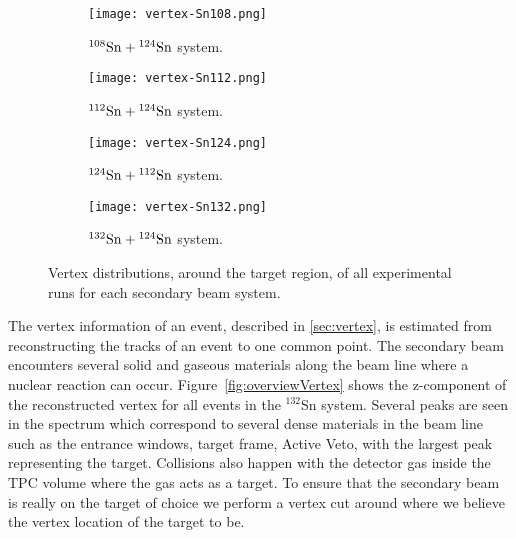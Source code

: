 \begin{figure}[!htb]
\centering
    \begin{subfigure}[t]{\textwidth}
        \centering
        \texttt{[image: vertex-Sn108.png]} 
        \caption{${}^{108}\mathrm{Sn} + {}^{124}\mathrm{Sn}$ system.} \label{fig:vertex108}
    \end{subfigure}
    \hfill
    \begin{subfigure}[t]{\textwidth}
        \centering
        \texttt{[image: vertex-Sn112.png]} 
        \caption{${}^{112}\mathrm{Sn} + {}^{124}\mathrm{Sn}$ system.} \label{fig:vertex112}
    \end{subfigure}
    
    \begin{subfigure}[t]{\textwidth}
        \centering
        \texttt{[image: vertex-Sn124.png]} 
        \caption{${}^{124}\mathrm{Sn} + {}^{112}\mathrm{Sn}$ system.} \label{fig:vertex124}
    \end{subfigure}
    \hfill
    \begin{subfigure}[t]{\textwidth}
        \centering
        \texttt{[image: vertex-Sn132.png]} 
        \caption{${}^{132}\mathrm{Sn} + {}^{124}\mathrm{Sn}$ system.} \label{fig:vertex132}
    \end{subfigure}
\caption{Vertex distributions, around the target region, of all experimental runs for each secondary beam system. }
\label{fig:vertexdist}
\end{figure}

The vertex information of an event, described in \ref{sec:vertex}, is estimated from reconstructing the tracks of an event to one common point. The secondary beam encounters several solid and gaseous materials along the beam line where a nuclear reaction can occur. Figure~\ref{fig:overviewVertex} shows the z-component of the reconstructed vertex for all events in the ${}^{132}$Sn system. Several peaks are seen in the spectrum which correspond to several dense materials in the beam line such as the entrance windows, target frame, Active Veto, with the largest peak representing the target. Collisions also happen with the detector gas inside the TPC volume where the gas acts as a target. To ensure that the secondary beam is really on the target of choice we perform a vertex cut around where we believe the vertex location of the target to be.
 
